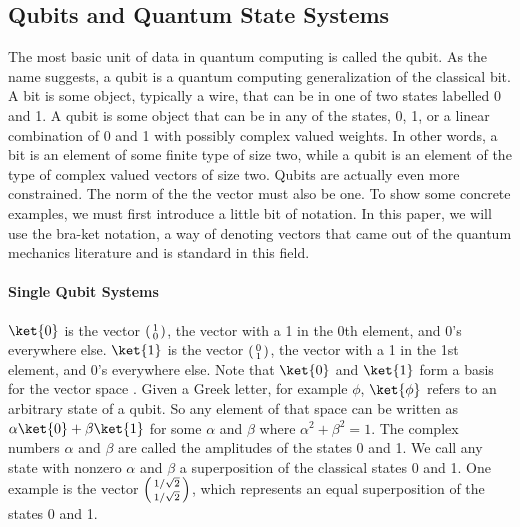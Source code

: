\subsection{Qubits and Quantum State Systems}
The most basic unit of data in quantum computing is called the qubit.
As the name suggests, a qubit is a quantum computing generalization of the classical bit.
A bit is some object, typically a wire, that can be in one of two states labelled 0 and 1.
A qubit is some object that can be in any of the states, 0, 1, or a linear combination of 0 and 1 with possibly complex valued weights.
In other words, a bit is an element of some finite type of size two, while a qubit is an element of the type of complex valued vectors of size two.
Qubits are actually even more constrained.
The norm of the the vector must also be one.
To show some concrete examples, we must first introduce a little bit of notation.
In this paper, we will use the bra-ket notation, a way of denoting vectors that came out of the quantum mechanics literature and is standard in this field. 

\paragraph{Single Qubit Systems}
$\ket{0}$ is the vector $\left(\begin{smallmatrix}1\\0\end{smallmatrix}\right)$, the vector with a 1 in the 0th element, and 0’s everywhere else.
$\ket{1}$ is the vector $\left(\begin{smallmatrix}0 \\ 1\end{smallmatrix}\right)$, the vector with a 1 in the 1st element, and 0’s everywhere else.
Note that $\ket{0}$ and $\ket{1}$ form a basis for the vector space .
Given a Greek letter, for example $\phi$, $\ket{\phi}$ refers to an arbitrary state of a qubit.
So any element of that space can be written as $\alpha\ket{0} + \beta\ket{1}$ for some $\alpha$ and $\beta$ where $\alpha^2 + \beta^2 = 1$.
The complex numbers $\alpha$ and $\beta$ are called the amplitudes of the states 0 and 1.
We call any state with nonzero $\alpha$ and $\beta$ a superposition of the classical states 0 and 1.
One example is the vector $\left(\begin{smallmatrix}1/\sqrt{2}\\ 1/\sqrt{2}\end{smallmatrix}\right)$, which represents an equal superposition of the states 0 and 1. 

